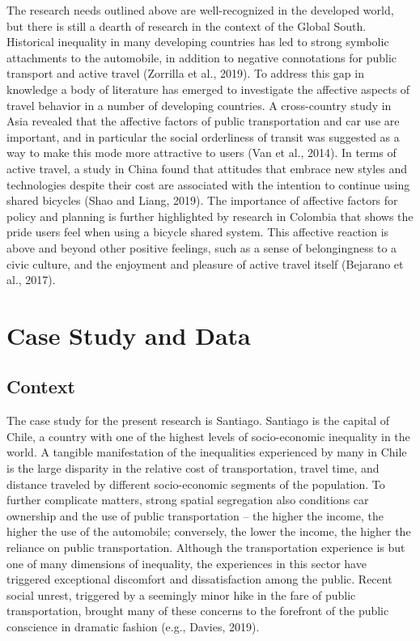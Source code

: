 \documentclass[]{elsarticle} %
\begin{document}
The research needs outlined above are well-recognized in the developed
world, but there is still a dearth of research in the context of the
Global South. Historical inequality in many developing countries has led
to strong symbolic attachments to the automobile, in addition to
negative connotations for public transport and active travel (Zorrilla
et al., 2019). To address this gap in knowledge a body of literature has
emerged to investigate the affective aspects of travel behavior in a
number of developing countries. A cross-country study in Asia revealed
that the affective factors of public transportation and car use are
important, and in particular the social orderliness of transit was
suggested as a way to make this mode more attractive to users (Van et
al., 2014). In terms of active travel, a study in China found that
attitudes that embrace new styles and technologies despite their cost
are associated with the intention to continue using shared bicycles
(Shao and Liang, 2019). The importance of affective factors for policy
and planning is further highlighted by research in Colombia that shows
the pride users feel when using a bicycle shared system. This affective
reaction is above and beyond other positive feelings, such as a sense of
belongingness to a civic culture, and the enjoyment and pleasure of
active travel itself (Bejarano et al., 2017).

\hypertarget{case-study-and-data}{%
\section{Case Study and Data}\label{case-study-and-data}}

\hypertarget{context}{%
\subsection{Context}\label{context}}

The case study for the present research is Santiago. Santiago is the
capital of Chile, a country with one of the highest levels of
socio-economic inequality in the world. A tangible manifestation of the
inequalities experienced by many in Chile is the large disparity in the
relative cost of transportation, travel time, and distance traveled by
different socio-economic segments of the population. To further
complicate matters, strong spatial segregation also conditions car
ownership and the use of public transportation -- the higher the income,
the higher the use of the automobile; conversely, the lower the income,
the higher the reliance on public transportation. Although the
transportation experience is but one of many dimensions of inequality,
the experiences in this sector have triggered exceptional discomfort and
dissatisfaction among the public. Recent social unrest, triggered by a
seemingly minor hike in the fare of public transportation, brought many
of these concerns to the forefront of the public conscience in dramatic
fashion (e.g., Davies, 2019).
\end{document}

